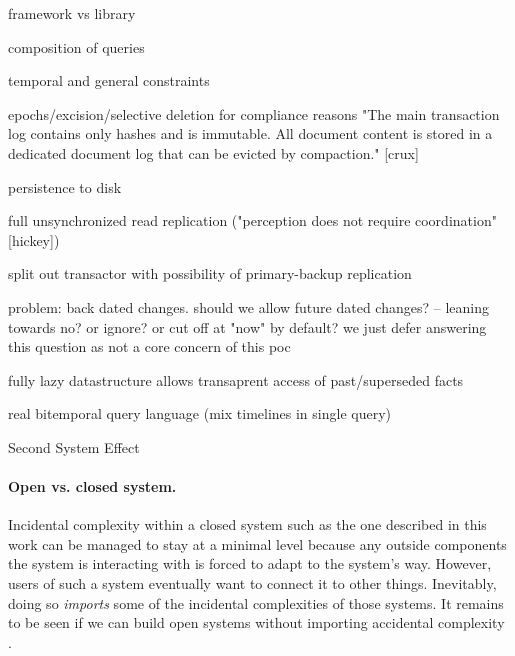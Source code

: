 framework vs library

composition of queries

temporal and general constraints

epochs/excision/selective deletion for compliance reasons
"The main transaction log contains only hashes and is immutable. All document content is stored in a dedicated document log that can be evicted by compaction." [crux]


persistence to disk

full unsynchronized read replication ("perception does not require coordination" [hickey])

split out transactor with possibility of primary-backup replication

problem: back dated changes. should we allow future dated changes? -- leaning towards no? or ignore? or cut off at "now" by default? we just defer answering this question as not a core concern of this poc


fully lazy datastructure allows transaprent access of past/superseded facts

real bitemporal query language (mix timelines in single query)

Second System Effect \cite{brooks1995mythical}

\paragraph{Open vs. closed system.} Incidental complexity within a closed system such as the one described in this work can be managed to stay at a minimal level because any outside components the system is interacting with is forced to adapt to the system's way. However, users of such a system eventually want to connect it to other things. Inevitably, doing so \emph{imports} some of the incidental complexities of those systems. It remains to be seen if we can build open systems without importing accidental complexity \cite{moffat16eve}.
